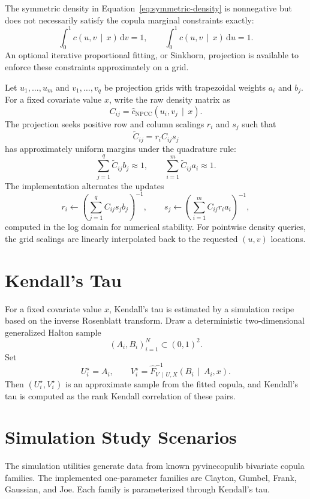\documentclass[11pt]{article}
\newcommand{\dd}{\,\mathrm{d}}
\newcommand{\given}{\,\mid\,}
\newcommand{\npcc}{\mathrm{NPCC}}
\begin{document}
The symmetric density in Equation~\eqref{eq:symmetric-density} is
nonnegative but does not necessarily satisfy the copula marginal
constraints exactly:
\[
  \int_0^1 c(u,v \given x)\dd v = 1,
  \qquad
  \int_0^1 c(u,v \given x)\dd u = 1.
\]
An optional iterative proportional fitting, or Sinkhorn, projection is
available to enforce these constraints approximately on a grid.

Let $u_1,\dots,u_m$ and $v_1,\dots,v_q$ be projection grids with
trapezoidal weights $a_i$ and $b_j$. For a fixed covariate value $x$,
write the raw density matrix as
\[
  C_{ij} = \widehat c_{\npcc}(u_i,v_j \given x).
\]
The projection seeks positive row and column scalings $r_i$ and $s_j$
such that
\[
  \widetilde C_{ij} = r_i C_{ij} s_j
\]
has approximately uniform margins under the quadrature rule:
\[
  \sum_{j=1}^q \widetilde C_{ij} b_j \approx 1,
  \qquad
  \sum_{i=1}^m \widetilde C_{ij} a_i \approx 1.
\]
The implementation alternates the updates
\[
  r_i
  \leftarrow
  \left(\sum_{j=1}^q C_{ij}s_j b_j\right)^{-1},
  \qquad
  s_j
  \leftarrow
  \left(\sum_{i=1}^m C_{ij}r_i a_i\right)^{-1},
\]
computed in the log domain for numerical stability. For pointwise
density queries, the grid scalings are linearly interpolated back to the
requested $(u,v)$ locations.

\section{Kendall's Tau}

For a fixed covariate value $x$, Kendall's tau is estimated by a
simulation recipe based on the inverse Rosenblatt transform. Draw a
deterministic two-dimensional generalized Halton sample
\[
  (A_i,B_i)_{i=1}^N \subset (0,1)^2.
\]
Set
\[
  U_i^\star = A_i,
  \qquad
  V_i^\star =
  \widehat F^{-1}_{V \given U,X}(B_i \given A_i,x).
\]
Then $(U_i^\star,V_i^\star)$ is an approximate sample from the fitted
copula, and Kendall's tau is computed as the rank Kendall correlation of
these pairs.

\section{Simulation Study Scenarios}

The simulation utilities generate data from known pyvinecopulib
bivariate copula families. The implemented one-parameter families are
Clayton, Gumbel, Frank, Gaussian, and Joe. Each family is parameterized
through Kendall's tau.
\end{document}

